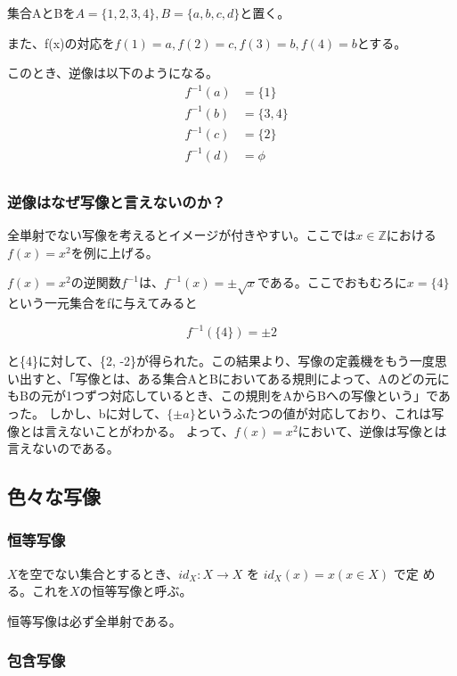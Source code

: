\documentclass[dvipdfmx,autodetect-engine]{jsarticle}
\begin{document}
\exam

集合AとBを$A = \{ 1, 2, 3, 4 \}, B = \{ a, b, c, d\}$と置く。

また、f(x)の対応を$f(1) = a, f(2) = c, f(3) = b, f(4) = b$とする。

このとき、逆像は以下のようになる。
\begin{eqnarray*}
&f^{-1}(a) &= \{1\} \\
&f^{-1}(b) &= \{3, 4\} \\
&f^{-1}(c) &= \{2\} \\
&f^{-1}(d) &= \phi \\
\end{eqnarray*}

\subsubsection{逆像はなぜ写像と言えないのか？}

全単射でない写像を考えるとイメージが付きやすい。ここでは$x \in \mathbb{Z}$における$f(x)=x^2$を例に上げる。

$f(x) = x^2$の逆関数$f^{-1}$は、$f^{-1}(x)=\pm \sqrt{x}$である。ここでおもむろに$x=\{4\}$という一元集合をfに与えてみると

$$
f^{-1}(\{4\}) = {\pm 2}
$$

と\{4\}に対して、\{2, -2\}が得られた。この結果より、写像の定義機をもう一度思い出すと、「写像とは、ある集合AとBにおいてある規則によって、Aのどの元にもBの元が1つずつ対応しているとき、この規則をAからBへの写像という」であった。
しかし、bに対して、$\{\pm a\}$というふたつの値が対応しており、これは写像とは言えないことがわかる。
よって、$f(x) = x^2$において、逆像は写像とは言えないのである。

\subsection{色々な写像}

\subsubsection{恒等写像}

$X$を空でない集合とするとき、$id_{X} : X → X$ を $id_{X}(x) = x (x ∈ X)$ で定
める。これを$X$の恒等写像と呼ぶ。

恒等写像は必ず全単射である。

\subsubsection{包含写像}
\end{document}
